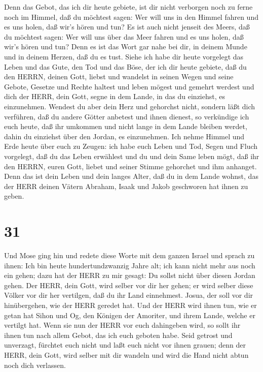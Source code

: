  Denn das Gebot, das ich dir heute gebiete, ist dir nicht
verborgen noch zu ferne  noch im Himmel, daß du möchtest
sagen: Wer will uns in den Himmel fahren und es uns holen, daß wir's
hören und tun?  Es ist auch nicht jenseit des Meers, daß du
möchtest sagen: Wer will uns über das Meer fahren und es uns holen, daß
wir's hören und tun?  Denn es ist das Wort gar nahe bei
dir, in deinem Munde und in deinem Herzen, daß du es tust. 
Siehe ich habe dir heute vorgelegt das Leben und das Gute, den Tod und
das Böse,  der ich dir heute gebiete, daß du den HERRN,
deinen Gott, liebst und wandelst in seinen Wegen und seine Gebote,
Gesetze und Rechte haltest und leben mögest und gemehrt werdest und dich
der HERR, dein Gott, segne in dem Lande, in das du einziehst, es
einzunehmen.  Wendest du aber dein Herz und gehorchst
nicht, sondern läßt dich verführen, daß du andere Götter anbetest und
ihnen dienest,  so verkündige ich euch heute, daß ihr
umkommen und nicht lange in dem Lande bleiben werdet, dahin du einziehst
über den Jordan, es einzunehmen.  Ich nehme Himmel und Erde
heute über euch zu Zeugen: ich habe euch Leben und Tod, Segen und Fluch
vorgelegt, daß du das Leben erwählest und du und dein Same leben mögt,
 daß ihr den HERRN, euren Gott, liebet und seiner Stimme
gehorchet und ihm anhanget. Denn das ist dein Leben und dein langes
Alter, daß du in dem Lande wohnst, das der HERR deinen Vätern Abraham,
Isaak und Jakob geschworen hat ihnen zu geben.

\hypertarget{section-30}{%
\section{31}\label{section-30}}

 Und Mose ging hin und redete diese Worte mit dem ganzen
Israel  und sprach zu ihnen: Ich bin heute hundertundzwanzig
Jahre alt; ich kann nicht mehr aus noch ein gehen; dazu hat der HERR zu
mir gesagt: Du sollst nicht über diesen Jordan gehen.  Der
HERR, dein Gott, wird selber vor dir her gehen; er wird selber diese
Völker vor dir her vertilgen, daß du ihr Land einnehmest. Josua, der
soll vor dir hinübergehen, wie der HERR geredet hat.  Und
der HERR wird ihnen tun, wie er getan hat Sihon und Og, den Königen der
Amoriter, und ihrem Lande, welche er vertilgt hat.  Wenn sie
nun der HERR vor euch dahingeben wird, so sollt ihr ihnen tun nach allem
Gebot, das ich euch geboten habe.  Seid getrost und
unverzagt, fürchtet euch nicht und laßt euch nicht vor ihnen grauen;
denn der HERR, dein Gott, wird selber mit dir wandeln und wird die Hand
nicht abtun noch dich verlassen.

